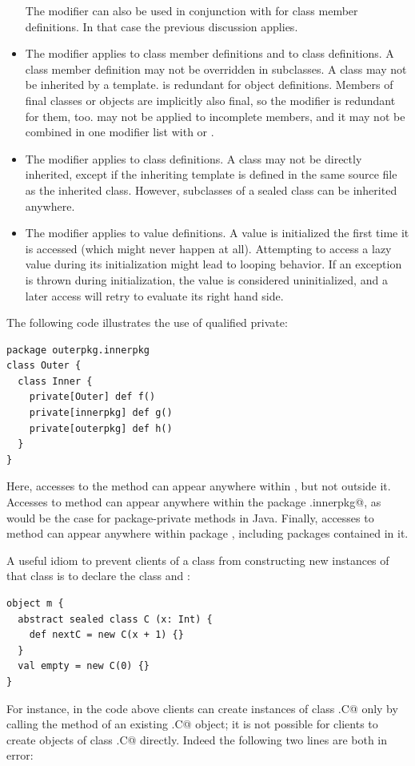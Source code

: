 \begin{itemize}
The  modifier can also be used in conjunction with
 for class member definitions. In that case the
previous discussion applies.
\item
The  modifier applies to class member definitions and to
class definitions. A  class member definition may not be
overridden in subclasses. A  class may not be inherited by
a template.  is redundant for object definitions.  Members
of final classes or objects are implicitly also final, so the
 modifier is redundant for them, too.   may
not be applied to incomplete members, and it may not be combined in one
modifier list with  or .
\item
The  modifier applies to class definitions. A
 class may not be directly inherited, except if the inheriting 
template is defined in the same source file as the inherited class.
However, subclasses of a sealed class can be inherited anywhere.
\item
The  modifier applies to value definitions. A 
value is initialized the first time it is accessed (which might never
happen at all). Attempting to access a lazy value during its
initialization might lead to looping behavior. If an exception is
thrown during initialization, the value is considered uninitialized,
and a later access will retry to evaluate its right hand side.
\end{itemize}

\example The following code illustrates the use of qualified private:
\begin{lstlisting}
package outerpkg.innerpkg
class Outer {
  class Inner {
    private[Outer] def f()
    private[innerpkg] def g()
    private[outerpkg] def h()
  }
}
\end{lstlisting}
Here, accesses to the method \lstinline@f@ can appear anywhere within
\lstinline@OuterClass@, but not outside it. Accesses to method
\lstinline@g@ can appear anywhere within the package
\lstinline@outerpkg.innerpkg@, as would be the case for
package-private methods in Java. Finally, accesses to method
\lstinline@h@ can appear anywhere within package \lstinline@outerpkg@,
including packages contained in it. 

\example A useful idiom to prevent clients of a class from
constructing new instances of that class is to declare the class
 and :

\begin{lstlisting}
object m {
  abstract sealed class C (x: Int) {
    def nextC = new C(x + 1) {}
  }
  val empty = new C(0) {}
}
\end{lstlisting}
For instance, in the code above clients can create instances of class
\lstinline@m.C@ only by calling the  method of an existing \lstinline@m.C@
object; it is not possible for clients to create objects of class
\lstinline@m.C@ directly. Indeed the following two lines are both in error:

